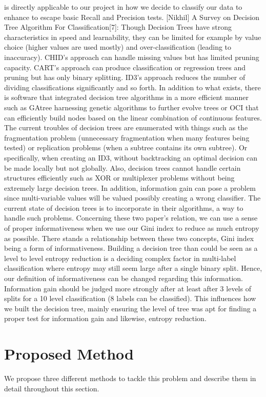 \documentclass[acmtog, authorversion]{acmart}
\begin{document}
is directly applicable to our project in how we decide to classify our data to enhance to escape basic Recall and Precision tests. 
[Nikhil] A Survey on Decision Tree Algorithm For Classification[7]: Though Decision Trees have strong characteristics in speed and learnability, they can 
be limited for example by value choice (higher values are used mostly) and over-classification (leading to inaccuracy). CHID’s approach can handle missing 
values but has limited pruning capacity. CART’s approach can produce classification or regression trees and pruning but has only binary splitting. ID3’s 
approach reduces the number of dividing classifications significantly and so forth. In addition to what exists, there is software that integrated decision 
tree algorithms in a more efficient manner such as GAtree harnessing genetic algorithms to further evolve trees or OCI that can efficiently build nodes 
based on the linear combination of continuous features. The current troubles of decision trees are enumerated with things such as the fragmentation 
problem (unnecessary fragmentation when many features being tested) or replication problems (when a subtree contains its own subtree). Or specifically, 
when creating an ID3, without backtracking an optimal decision can be made locally but not globally. Also, decision trees cannot handle certain structures 
efficiently such as XOR or multiplexer problems without being extremely large decision trees. In addition, information gain can pose a problem since 
multi-variable values will be valued possibly creating a wrong classifier. The current state of decision trees is to incorporate in their algorithms, 
a way to handle such problems. Concerning these two paper's relation, we can use a sense of proper informativeness when we use our Gini index to reduce as much entropy as possible. There stands a relationship between these two concepts, Gini index being a form of informativeness. Building a decision tree than could be seen as a level to level entropy reduction is a deciding complex factor in multi-label classification where entropy may still seem large after a single binary split. Hence, our definition of informativeness can be changed regarding this information. Information gain should be judged more strongly after at least after 3 levels of splits for a 10 level classification (8 labels can be classified). This influences how we built the decision tree, mainly ensuring the level of tree was apt for finding a proper test for information gain and likewise, entropy reduction. 
\section{Proposed Method}
We propose three different methods to tackle this problem and describe them in detail throughout this section.
\end{document}
